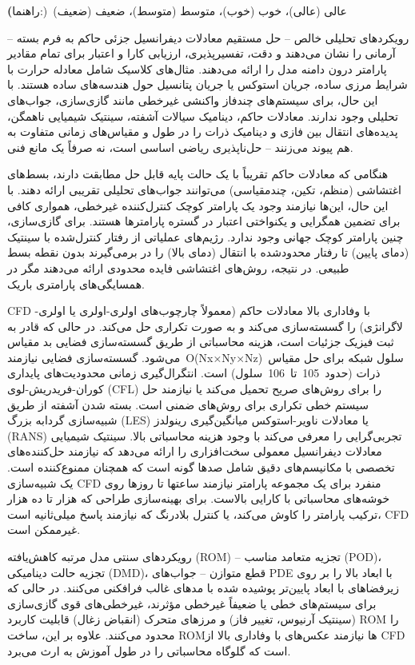 \documentclass[12pt, a4paper]{article}
\begin{document}
\textbf(راهنما:) عالی (عالی)، خوب (خوب)، متوسط (متوسط)، ضعیف (ضعیف)

رویکردهای تحلیلی خالص – حل مستقیم معادلات دیفرانسیل جزئی حاکم به فرم بسته – آرمانی را نشان می‌دهند و دقت، تفسیرپذیری، ارزیابی کارا و اعتبار برای تمام مقادیر پارامتر درون دامنه مدل را ارائه می‌دهند. مثال‌های کلاسیک شامل معادله حرارت با شرایط مرزی ساده، جریان استوکس یا جریان پتانسیل حول هندسه‌های ساده هستند. با این حال، برای سیستم‌های چندفاز واکنشی غیرخطی مانند گازی‌سازی، جواب‌های تحلیلی وجود ندارند. معادلات حاکم، دینامیک سیالات آشفته، سینتیک شیمیایی ناهمگن، پدیده‌های انتقال بین فازی و دینامیک ذرات را در طول و مقیاس‌های زمانی متفاوت به هم پیوند می‌زنند – حل‌ناپذیری ریاضی اساسی است، نه صرفاً یک مانع فنی.

هنگامی که معادلات حاکم تقریباً با یک حالت پایه قابل حل مطابقت دارند، بسط‌های اغتشاشی (منظم، تکین، چندمقیاسی) می‌توانند جواب‌های تحلیلی تقریبی ارائه دهند. با این حال، این‌ها نیازمند وجود یک پارامتر کوچک کنترل‌کننده غیرخطی، همواری کافی برای تضمین همگرایی و یکنواختی اعتبار در گستره پارامترها هستند. برای گازی‌سازی، چنین پارامتر کوچک جهانی وجود ندارد. رژیم‌های عملیاتی از رفتار کنترل‌شده با سینتیک (دمای پایین) تا رفتار محدودشده با انتقال (دمای بالا) را در برمی‌گیرند بدون نقطه بسط طبیعی. در نتیجه، روش‌های اغتشاشی فایده محدودی ارائه می‌دهند مگر در همسایگی‌های پارامتری باریک.

CFD با وفاداری بالا معادلات حاکم (معمولاً چارچوب‌های اولری-اولری یا اولری-لاگرانژی) را گسسته‌سازی می‌کند و به صورت تکراری حل می‌کند. در حالی که قادر به ثبت فیزیک جزئیات است، هزینه محاسباتی از طریق گسسته‌سازی فضایی بد مقیاس می‌شود. گسسته‌سازی فضایی نیازمند O(Nx×Ny×Nz) سلول شبکه برای حل مقیاس ذرات (حدود 105 تا 106 سلول) است. انتگرال‌گیری زمانی محدودیت‌های پایداری کوران-فریدریش-لوی (CFL) را برای روش‌های صریح تحمیل می‌کند یا نیازمند حل سیستم خطی تکراری برای روش‌های ضمنی است. بسته شدن آشفته از طریق شبیه‌سازی گردابه بزرگ (LES) یا معادلات ناویر-استوکس میانگین‌گیری رینولدز (RANS) تجربی‌گرایی را معرفی می‌کند با وجود هزینه محاسباتی بالا. سینتیک شیمیایی معادلات دیفرانسیل معمولی سخت‌افزاری را ارائه می‌دهد که نیازمند حل‌کننده‌های تخصصی با مکانیسم‌های دقیق شامل صدها گونه است که همچنان ممنوع‌کننده است. یک شبیه‌سازی CFD منفرد برای یک مجموعه پارامتر نیازمند ساعتها تا روزها روی خوشه‌های محاسباتی با کارایی بالاست. برای بهینه‌سازی طراحی که هزار تا ده هزار ترکیب پارامتر را کاوش می‌کند، یا کنترل بلادرنگ که نیازمند پاسخ میلی‌ثانیه است، CFD غیرممکن است.

رویکردهای سنتی مدل مرتبه کاهش‌یافته (ROM) – تجزیه متعامد مناسب (POD)، تجزیه حالت دینامیکی (DMD)، قطع متوازن – جواب‌های PDE با ابعاد بالا را بر روی زیرفضاهای با ابعاد پایین‌تر پوشیده شده با مدهای غالب فرافکنی می‌کنند. در حالی که برای سیستم‌های خطی یا ضعیفاً غیرخطی مؤثرند، غیرخطی‌های قوی گازی‌سازی (سینتیک آرنیوس، تغییر فاز) و مرزهای متحرک (انقباض زغال) قابلیت کاربرد ROM را محدود می‌کنند. علاوه بر این، ساخت ROMها نیازمند عکس‌های با وفاداری بالا از CFD است که گلوگاه محاسباتی را در طول آموزش به ارث می‌برد.
\end{document}
